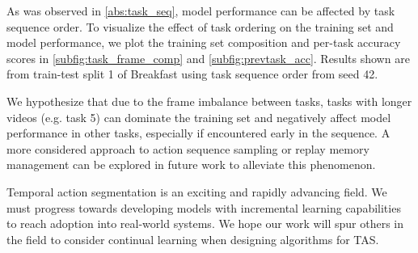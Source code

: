 As was observed in \cref{abs:task_seq}, model performance can be affected by task sequence order. To visualize the effect of task ordering on the training set and model performance, we plot the training set composition and per-task accuracy scores in  \cref{subfig:task_frame_comp} and \cref{subfig:prevtask_acc}. Results shown are from train-test split 1 of Breakfast using task sequence order from seed 42. 

We hypothesize that due to the frame imbalance between tasks, tasks with longer videos (e.g. task 5) can dominate the training set and negatively affect model performance in other tasks, especially if encountered early in the sequence. A more considered approach to action sequence sampling or replay memory management can be explored in future work to alleviate this phenomenon.

Temporal action segmentation is an exciting and rapidly advancing field. We must progress towards developing models with incremental learning capabilities to reach adoption into real-world systems. We hope our work will spur others in the field to consider continual learning when designing algorithms for TAS.